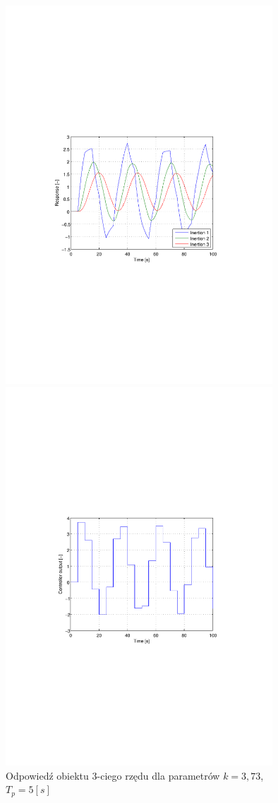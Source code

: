 \documentclass[12pt]{article}
\begin{document}
\newpage

\begin{figure}[!htb]
	\begin{center}
		\includegraphics[trim=5cm 9cm 5cm 9cm,width=10cm]{../res/img/d2_5_3,73y.pdf}
	\end{center}
	
	\begin{center}
		\includegraphics[trim=5cm 9cm 5cm 9cm,width=10cm]{../res/img/d2_5_3,73u.pdf} 
	\end{center}
	\caption{Odpowiedź obiektu 3-ciego rzędu dla parametrów $k=3,73$,
	$T_p=5[s]$}
\end{figure}
\end{document}
